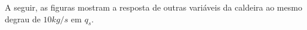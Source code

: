 \begin{figure}[H]
\end{figure}

A seguir, as figuras mostram a resposta de outras variáveis da
caldeira ao mesmo degrau de $10kg/s$ em $q_s$.

